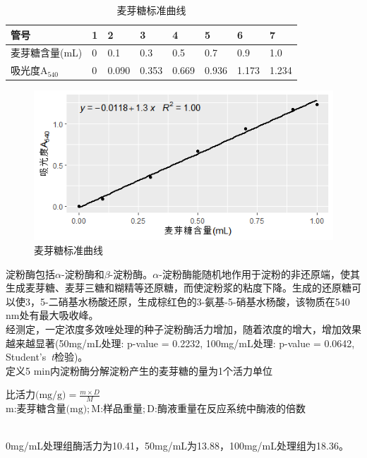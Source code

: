 \documentclass[UTF8]{ctexart}
\begin{document}
    \begin{table}[h]
        \centering
        \setlength{\abovecaptionskip}{0.cm}
        \caption{麦芽糖标准曲线}
        \begin{tabular}{llllllll}
        \hline
        管号        & 1 & 2     & 3     & 4     & 5     & 6     & 7     \\ \hline
        麦芽糖含量(mL) & 0 & 0.1   & 0.3   & 0.5   & 0.7   & 0.9   & 1.0   \\
        吸光度A$_{540}$   & 0 & 0.090 & 0.353 & 0.669 & 0.936 & 1.173 & 1.234 \\ \hline
        \end{tabular}%
    \end{table}


    \begin{figure}%
        \caption{麦芽糖标准曲线}
        \setlength{\abovecaptionskip}{0.cm}
        \includegraphics[scale=0.75]{maiyatang.png}
    \end{figure}


    \indent 淀粉酶包括$\alpha$-淀粉酶和$\beta$-淀粉酶。$\alpha$-淀粉酶能随机地作用于淀粉的非还原端，使其生成麦芽糖、麦芽三糖和糊精等还原糖，而使淀粉浆的粘度下降。生成的还原糖可以使3，5-二硝基水杨酸还原，生成棕红色的3-氨基-5-硝基水杨酸，该物质在540 nm处有最大吸收峰。    
    \\ \indent 经测定，一定浓度多效唑处理的种子淀粉酶活力增加，随着浓度的增大，增加效果越来越显著(50mg/mL处理: p-value = 0.2232, 100mg/mL处理: p-value = 0.0642, Student's\ \textit{t}检验)。
    \\ \indent 定义5 min内淀粉酶分解淀粉产生的麦芽糖的量为1个活力单位
    \begin{center}
    $\mbox{比活力(mg/g)} = \frac{m \times D}{M} $
    \\ $\mbox{m:麦芽糖含量(mg)}; \mbox{M:样品重量}; \mbox{D:酶液重量在反应系统中酶液的倍数}$
    \\
    \end{center}
    \ 
    \\ \indent 0mg/mL处理组酶活力为10.41，50mg/mL为13.88，100mg/mL处理组为18.36。
\end{document}
